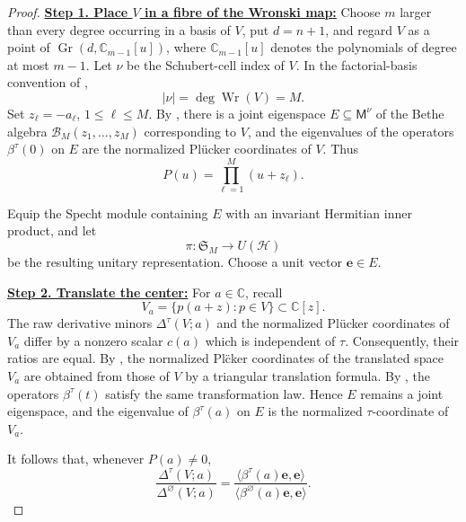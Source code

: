 \documentclass[12pt,letterpaper,reqno]{amsart}
\theoremstyle{definition}
\numberwithin{equation}{section}
\newcommand{\C}{\mathbb C}
\newcommand{\ev}{\bm  e}
\begin{document}
\begin{proof}

\medskip\noindent
\textbf{\underline{Step 1. Place \(V\) in a fibre of the Wronski map:}}
Choose \(m\) larger than every degree occurring in a basis of \(V\),
put \(d=n+1\), and regard \(V\) as a point of
\(\operatorname{Gr}(d,\mathbb C_{m-1}[u])\), where
\(\mathbb C_{m-1}[u]\) denotes the polynomials of degree at most
\(m-1\). Let \(\nu\) be the Schubert-cell index of \(V\). In the
factorial-basis convention of \cite{KP26},
\[
|\nu|=\deg\operatorname{Wr}(V)=M.
\]
Set \(z_\ell=-a_\ell\), \(1\leq\ell\leq M\). By
\cite[Theorem~1.3(v)]{KP26}, there is a joint eigenspace
\(E\subseteq\mathsf M^\nu\) of the Bethe algebra
\(\mathcal B_M(z_1,\ldots,z_M)\) corresponding to \(V\), and the
eigenvalues of the operators \(\beta^\tau(0)\) on \(E\) are the
normalized Pl\"ucker coordinates of \(V\). Thus
\[
P(u)=\prod_{\ell=1}^M(u+z_\ell).
\]

Equip the Specht module containing \(E\) with an invariant Hermitian
inner product, and let
\[
\pi:\mathfrak S_M\longrightarrow U(\mathcal H)
\]
be the resulting unitary representation. Choose a unit vector
$
\ev\in E.
$

\medskip\noindent
\textbf{\underline{Step 2. Translate the center:}}
For \(a\in\C\), recall
\[
V_a=\{p(a+z):p\in V\}\subset\C[z].
\]
The raw derivative minors \(\Delta^\tau(V;a)\) and the normalized
Pl\"ucker coordinates of \(V_a\) differ by a nonzero scalar \(c(a)\)
which is independent of \(\tau\). Consequently, their ratios are
equal. By \cite[Proposition~2.9]{KP26}, the normalized Pl\"cker
coordinates of the translated space \(V_a\) are obtained from those of
\(V\) by a triangular translation formula. By
\cite[Theorem~1.3(ii)]{KP26}, the operators \(\beta^\tau(t)\) satisfy
the same transformation law. Hence \(E\) remains a joint eigenspace,
and the eigenvalue of \(\beta^\tau(a)\) on \(E\) is the normalized
\(\tau\)-coordinate of \(V_a\).

It follows that, whenever \(P(a)\ne0\),
\begin{equation}\label{eq:minor-beta-ratio}
 \frac{\Delta^\tau(V;a)}
      {\Delta^\varnothing(V;a)}
 =
 \frac{\langle\beta^\tau(a)\ev,\ev\rangle}
      {\langle\beta^\varnothing(a)\ev,\ev\rangle}.
\end{equation}


\end{proof}
\end{document}
